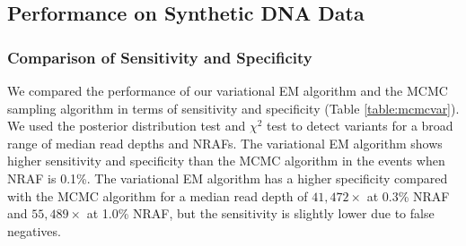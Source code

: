 \documentclass{bmcart}
\begin{document}
\subsection{Performance on Synthetic DNA Data}

\subsubsection{Comparison of Sensitivity and Specificity}

We compared the performance of our variational EM algorithm and the MCMC sampling algorithm in terms of sensitivity and specificity (Table \ref{table:mcmcvar}).
We used the posterior distribution test and $\chi^2$ test to detect variants for a broad range of median read depths and NRAFs.
The variational EM algorithm shows higher sensitivity and specificity than the MCMC algorithm in the events when NRAF is 0.1\%.
The variational EM algorithm has a higher specificity compared with the MCMC algorithm for a median read depth of $41,472\times$ at 0.3\% NRAF and $55,489\times$ at 1.0\% NRAF, but the sensitivity is slightly lower due to false negatives.
%
\end{document}
